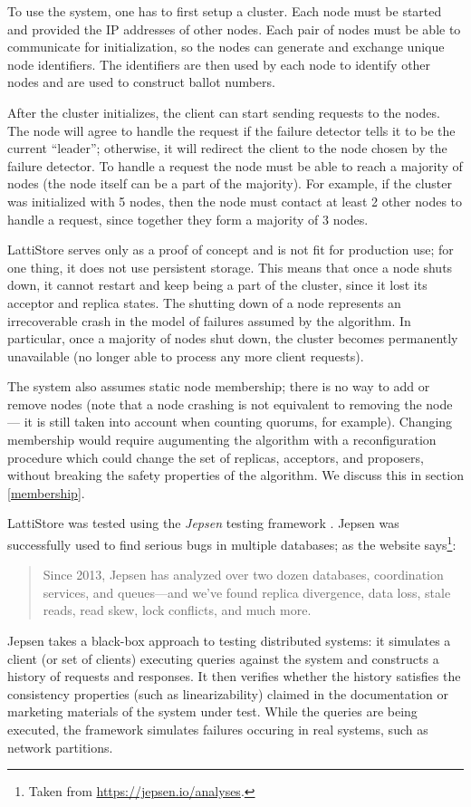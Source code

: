 \documentclass[12pt,a4paper,en]{pracamgr}
\newcommand{\ti}[1]{\textit{#1}}
\begin{document}
To use the system, one has to first setup a cluster. Each node must be started and provided the IP addresses of other nodes. Each pair of nodes must be able to communicate for initialization, so the nodes can generate and exchange unique node identifiers. The identifiers are then used by each node to identify other nodes and are used to construct ballot numbers.

After the cluster initializes, the client can start sending requests to the nodes. The node will agree to handle the request if the failure detector tells it to be the current ``leader''; otherwise, it will redirect the client to the node chosen by the failure detector. To handle a request the node must be able to reach a majority of nodes (the node itself can be a part of the majority). For example, if the cluster was initialized with 5 nodes, then the node must contact at least 2 other nodes to handle a request, since together they form a majority of 3 nodes.

LattiStore serves only as a proof of concept and is not fit for production use; for one thing, it does not use persistent storage. This means that once a node shuts down, it cannot restart and keep being a part of the cluster, since it lost its acceptor and replica states. The shutting down of a node represents an irrecoverable crash in the model of failures assumed by the algorithm. In particular, once a majority of nodes shut down, the cluster becomes permanently unavailable (no longer able to process any more client requests).

The system also assumes static node membership; there is no way to add or remove nodes (note that a node crashing is not equivalent to removing the node --- it is still taken into account when counting quorums, for example). Changing membership would require augumenting the algorithm with a reconfiguration procedure which could change the set of replicas, acceptors, and proposers, without breaking the safety properties of the algorithm. We discuss this in section \ref{membership}.

LattiStore was tested using the \ti{Jepsen} testing framework \cite{jepsen}. Jepsen was successfully used to find serious bugs in multiple databases; as the website says\footnote{Taken from \url{https://jepsen.io/analyses}.}:
\begin{quote}
Since 2013, Jepsen has analyzed over two dozen databases, coordination services, and queues—and we’ve found replica divergence, data loss, stale reads, read skew, lock conflicts, and much more.
\end{quote}
Jepsen takes a black-box approach to testing distributed systems: it simulates a client (or set of clients) executing queries against the system and constructs a history of requests and responses. It then verifies whether the history satisfies the consistency properties (such as linearizability) claimed in the documentation or marketing materials of the system under test. While the queries are being executed, the framework simulates failures occuring in real systems, such as network partitions.
\end{document}
